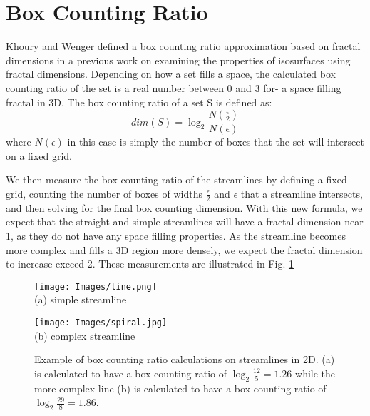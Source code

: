 \documentclass{egpubl}
\begin{document}
\section{Box Counting Ratio} \label{sec:bcr}

Khoury and Wenger \cite{khoury} defined a box counting ratio approximation based on fractal dimensions in a previous work on examining the properties of isosurfaces using fractal dimensions.
Depending on how a set fills a space, the calculated box counting ratio of the set is a real number between 0 and 3 for- a space filling fractal in 3D.
The box counting ratio of a set S is defined as:
\begin{equation} dim(S) = \log_2\frac{N(\frac{\epsilon}{2})}{N(\epsilon)}\end{equation}
where $N(\epsilon)$ in this case is simply the number of boxes that the set will intersect on a fixed grid.

We then measure the box counting ratio of the streamlines by defining a fixed grid, counting the number of boxes of widths $\frac{\epsilon}{2}$ and ${\epsilon}$ that a streamline intersects, and then solving for the final box counting dimension.
With this new formula, we expect that the straight and simple streamlines will have a fractal dimension near 1, as they do not have any space filling properties.
As the streamline becomes more complex and fills a 3D region more densely, we expect the fractal dimension to increase exceed 2.
These measurements are illustrated in Fig. \ref{fig:box_counting_calcs}

\begin{figure}[h]
        \centering
                \begin{minipage}{0.49\linewidth}
                        \small \centering
                        \texttt{[image: Images/line.png]} \\ (a) simple streamline
                \end{minipage}
                \begin{minipage}{0.49\linewidth}
                        \small \centering
                        \texttt{[image: Images/spiral.jpg]} \\ (b) complex streamline
                \end{minipage}
        \caption{Example of box counting ratio calculations on streamlines in 2D. (a) is calculated to have a box counting ratio of  $\log_2\frac{12}{5} = 1.26$ while the more complex line (b) is calculated to have a box counting ratio of $\log_2\frac{29}{8} = 1.86$.}
        \label{fig:box_counting_calcs}
\end{figure}
\end{document}
